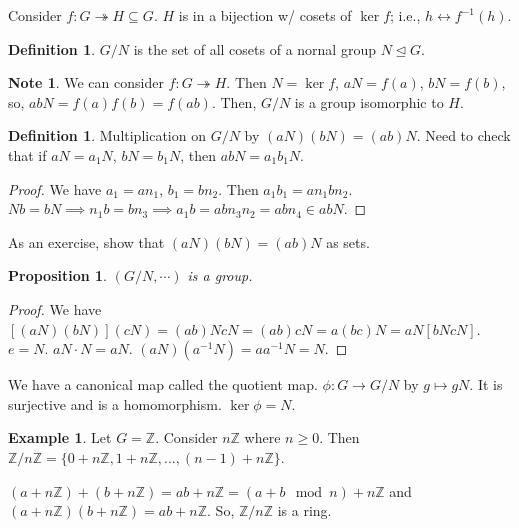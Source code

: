 \documentclass{amsart}
\newtheorem{prop}[thm]{Proposition}
\theoremstyle{definition}
\newtheorem{definition}[thm]{Definition}
\newtheorem{example}[thm]{Example}
\newtheorem{note}[thm]{Note}
\newcommand{\Z}{\mathbb Z}
\begin{document}
Consider $f:G\twoheadrightarrow H\subseteq G$. $H$ is in a bijection w/ cosets of $\ker f$; i.e., $h\leftrightarrow f^{-1}(h)$.

\begin{definition}
	$G/N$ is the set of all cosets of a nornal group $N\unlhd G$.
\end{definition}
\begin{note}
	We can consider $f:G\twoheadrightarrow H$. Then $N=\ker f$, $aN=f(a)$, $bN=f(b)$, so, $abN=f(a)f(b)=f(ab)$. Then, $G/N$ is a group isomorphic to $H$. 
\end{note}
\begin{definition}
	Multiplication on $G/N$ by $(aN)(bN)=(ab)N$. Need to check that if $aN=a_1N$, $bN=b_1N$, then $abN=a_1b_1N$.
\end{definition}
\begin{proof}
	We have $a_1=an_1$, $b_1=bn_2$. Then $a_1b_1=an_1bn_2$. $Nb=bN\implies n_1b=bn_3 \implies a_1b=abn_3n_2=abn_4\in abN$.
\end{proof}
As an exercise, show that $(aN)(bN)=(ab)N$ as sets.
\begin{prop}
	$(G/N,\cdots)$ is a group.
\end{prop}
\begin{proof}
	We have $[(aN)(bN)](cN)=(ab)NcN=(ab)cN=a(bc)N=aN[bNcN]$. $e=N$. $aN\cdot N=aN$. $(aN)(a^{-1}N)=aa^{-1}N=N$.
\end{proof}
We have a canonical map called the quotient map. $\phi:G\to G/N$ by $g\mapsto gN$. It is surjective and is a homomorphism. $\ker \phi=N$.
\begin{example}
	Let $G=\Z$. Consider $n\Z$ where $n\geq 0$. Then $\Z/n\Z=\{0+n\Z,1+n\Z,...,(n-1)+n\Z\}$.
	
	$(a+n\Z)+(b+n\Z)=ab+n\Z=(a+b\mod n)+n\Z$ and $(a+n\Z)(b+n\Z)=ab+n\Z$. So, $\Z/n\Z$ is a ring.
\end{example}
\end{document}

